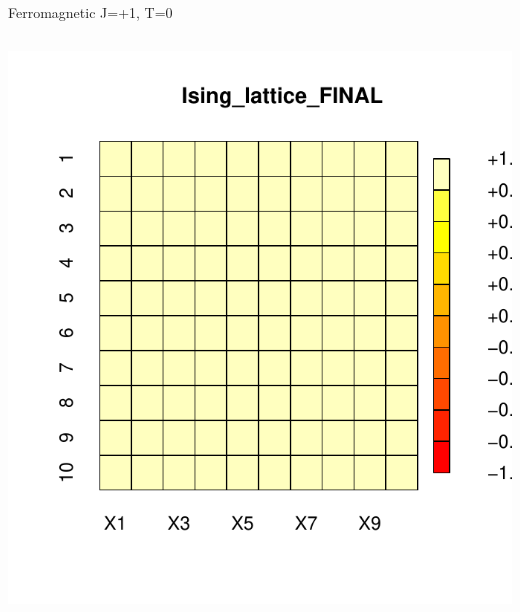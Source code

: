 \documentclass{beamer}
\begin{document}
\begin{frame}{Ferromagnetic J=+1, T=0}
\begin{columns}
\begin{column}{0.5\textwidth}
\begin{center}
     \includegraphics[width=\textwidth]{Pic/J+1_10_6000_T=0_FINAL.pdf}
     \end{center}
\end{column}
\end{columns}
\end{frame}
\end{document}
